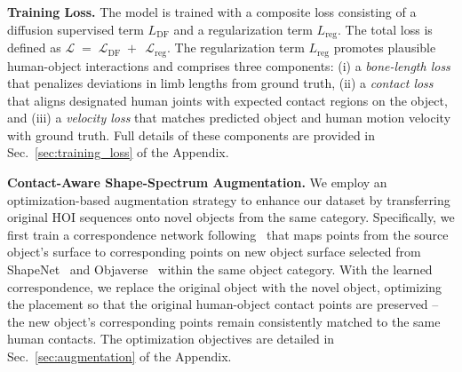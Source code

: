 \noindent\textbf{Training Loss.}
The model is trained with a composite loss consisting of a diffusion supervised term $L_{\text{DF}}$ and a regularization term $L_{\text{reg}}$. The total loss is defined as
$
    \mathcal{L}
    \;=\;
    \mathcal{L}_{\text{DF}}
    \;+\;
    \,\mathcal{L}_{\text{reg}}.
$
 The regularization term $L_{\text{reg}}$ promotes plausible human-object interactions and comprises three components: (i) a \emph{bone-length loss} that penalizes deviations in limb lengths from ground truth, (ii) a \emph{contact loss} that aligns designated human joints with expected contact regions on the object, and (iii) a \emph{velocity loss} that matches predicted object and human motion velocity with ground truth. Full details of these components are
provided in Sec.~\ref{sec:training_loss} of the Appendix.


\noindent \textbf{Contact-Aware Shape-Spectrum Augmentation.}
We employ an optimization-based augmentation strategy to enhance our dataset by transferring original HOI sequences onto novel objects from the same category. Specifically, we first train a correspondence network following~\citet{xie2024intertrack} that maps points from the source object's surface to corresponding points on new object surface selected from ShapeNet~\citep{chang2015shapenet} and Objaverse~\citep{deitke2023objaverse} within the same object category. With the learned correspondence, we replace the original object with the novel object, optimizing the placement so that the original human-object contact points are preserved -- the new object's corresponding points remain consistently matched to the same human contacts. The optimization objectives are detailed in Sec.~\ref{sec:augmentation} of the Appendix.




\textbf{}


